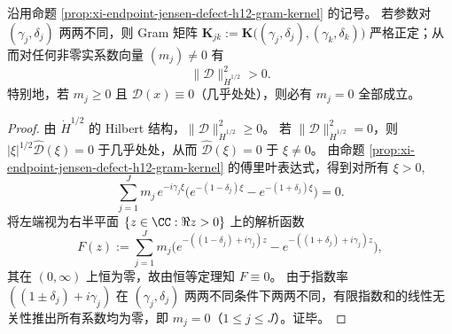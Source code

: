 \begin{proposition}\label{prop:xi-endpoint-jensen-defect-h12-strict-pd}
沿用命题 \ref{prop:xi-endpoint-jensen-defect-h12-gram-kernel} 的记号。
若参数对 \((\gamma_j,\delta_j)\) 两两不同，则 Gram 矩阵
\(\mathbf K_{jk}:=\mathbf K\!\bigl((\gamma_j,\delta_j),(\gamma_k,\delta_k)\bigr)\)
严格正定；从而对任何非零实系数向量 \((m_j)\neq 0\) 有
\[
\|\mathcal D\|_{\dot H^{1/2}}^2>0.
\]
特别地，若 \(m_j\ge 0\) 且 \(\mathcal D(x)\equiv 0\)（几乎处处），则必有 \(m_j=0\) 全部成立。
\end{proposition}
\begin{proof}
由 \(\dot H^{1/2}\) 的 Hilbert 结构，\(\|\mathcal D\|_{\dot H^{1/2}}^2\ge 0\)。
若 \(\|\mathcal D\|_{\dot H^{1/2}}^2=0\)，则 \( |\xi|^{1/2}\widehat{\mathcal D}(\xi)=0 \) 于几乎处处，从而 \(\widehat{\mathcal D}(\xi)=0\) 于 \(\xi\neq 0\)。
由命题 \ref{prop:xi-endpoint-jensen-defect-h12-gram-kernel} 的傅里叶表达式，得到对所有 \(\xi>0\),
\[
\sum_{j=1}^{J} m_j\,e^{-i\gamma_j\xi}\bigl(e^{-(1-\delta_j)\xi}-e^{-(1+\delta_j)\xi}\bigr)=0.
\]
将左端视为右半平面 \(\{z\in\CC:\Re z>0\}\) 上的解析函数
\[
F(z):=\sum_{j=1}^{J}m_j\bigl(e^{-((1-\delta_j)+i\gamma_j)z}-e^{-((1+\delta_j)+i\gamma_j)z}\bigr),
\]
其在 \((0,\infty)\) 上恒为零，故由恒等定理知 \(F\equiv 0\)。
由于指数率 \(((1\pm\delta_j)+i\gamma_j)\) 在 \((\gamma_j,\delta_j)\) 两两不同条件下两两不同，有限指数和的线性无关性推出所有系数均为零，即 \(m_j=0\)（\(1\le j\le J\)）。证毕。
\end{proof}

